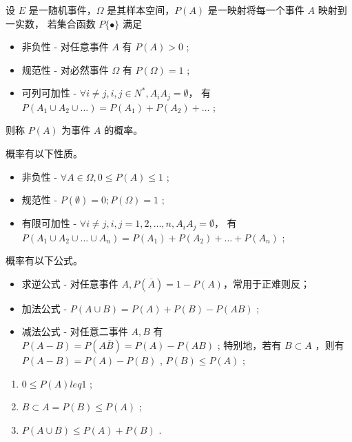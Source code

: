 
\begin{Def}[概率的公理化定义]

    设 $ E $ 是一随机事件，$ \Omega $ 是其样本空间，$ P(A) $ 是一映射将每一个事件 $ A $ 映射到一实数，
    若集合函数 $ P\{\bullet\} $ 满足
    \begin{itemize}
        \item 非负性 - 对任意事件 $ A $ 有 $ P(A)>0 $ ;
        \item 规范性 - 对必然事件 $ \Omega $ 有 $ P(\Omega) = 1 $ ;
        \item 可列可加性 - $ \forall i\neq j, i,j \in N^*, A_iA_j = \emptyset $，
        有 $ P(A_1\cup A_2\cup \dots) = P(A_1) + P(A_2) + \dots $ ;
    \end{itemize}
    则称 $ P(A) $ 为事件 $ A $ 的概率。
\end{Def}

概率有以下性质。
\begin{itemize}
    \item 非负性 - $ \forall A \in \Omega, 0 \leq P(A) \leq 1 $ ;
    \item 规范性 - $ P(\emptyset) = 0; P(\Omega) = 1 $ ;
    \item 有限可加性 - $ \forall i\neq j, i,j = 1,2,\dots,n, A_iA_j = \emptyset $，\newline
    有 $ P(A_1\cup A_2\cup \dots \cup A_n) = P(A_1) + P(A_2) + \dots + P(A_n)$ ;
\end{itemize}

概率有以下公式。
\begin{itemize}
    \item 求逆公式 - 对任意事件 $ A , P(\overline A) = 1 - P(A) $，常用于正难则反；
    \item 加法公式 - $ P(A\cup B) = P(A) + P(B) - P(AB) $ ;
    \item 减法公式 - 对任意二事件 $ A,B $ 有 $ P(A-B) = P(A\overline B)=P(A)-P(AB) $ ;
    特别地，若有 $ B\subset A $ ，则有 $ P(A-B)=P(A)-P(B) $ , $ P(B)\leq P(A) $ ;
\end{itemize}

\begin{Field}[概率不等式]

    \begin{enumerate}
        \item $ 0 \leq P(A) leq 1 $ ;
        \item $ B\subset A =  P(B)\leq P(A) $ ;
        \item $ P(A\cup B)\leq P(A)+P(B) $ .
    \end{enumerate}
\end{Field}

